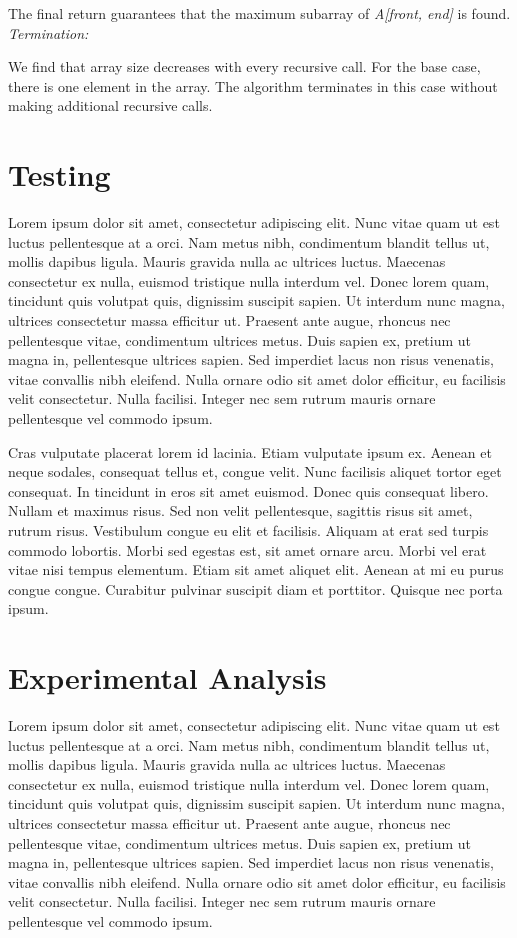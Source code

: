 \documentclass[11pt]{scrreprt}
\begin{document}
The final return guarantees that the maximum subarray of \textit{A[front, end]} is found. \\
\emph{Termination:}

We find that array size decreases with every recursive call. For the base case, there is one element in the array. The algorithm terminates in this case without making additional recursive calls.


\chapter{Testing}

Lorem ipsum dolor sit amet, consectetur adipiscing elit. Nunc vitae quam ut est luctus pellentesque at a orci. Nam metus nibh, condimentum blandit tellus ut, mollis dapibus ligula. Mauris gravida nulla ac ultrices luctus. Maecenas consectetur ex nulla, euismod tristique nulla interdum vel. Donec lorem quam, tincidunt quis volutpat quis, dignissim suscipit sapien. Ut interdum nunc magna, ultrices consectetur massa efficitur ut. Praesent ante augue, rhoncus nec pellentesque vitae, condimentum ultrices metus. Duis sapien ex, pretium ut magna in, pellentesque ultrices sapien. Sed imperdiet lacus non risus venenatis, vitae convallis nibh eleifend. Nulla ornare odio sit amet dolor efficitur, eu facilisis velit consectetur. Nulla facilisi. Integer nec sem rutrum mauris ornare pellentesque vel commodo ipsum.

Cras vulputate placerat lorem id lacinia. Etiam vulputate ipsum ex. Aenean et neque sodales, consequat tellus et, congue velit. Nunc facilisis aliquet tortor eget consequat. In tincidunt in eros sit amet euismod. Donec quis consequat libero. Nullam et maximus risus. Sed non velit pellentesque, sagittis risus sit amet, rutrum risus. Vestibulum congue eu elit et facilisis. Aliquam at erat sed turpis commodo lobortis. Morbi sed egestas est, sit amet ornare arcu. Morbi vel erat vitae nisi tempus elementum. Etiam sit amet aliquet elit. Aenean at mi eu purus congue congue. Curabitur pulvinar suscipit diam et porttitor. Quisque nec porta ipsum. 


\chapter{Experimental Analysis}

Lorem ipsum dolor sit amet, consectetur adipiscing elit. Nunc vitae quam ut est luctus pellentesque at a orci. Nam metus nibh, condimentum blandit tellus ut, mollis dapibus ligula. Mauris gravida nulla ac ultrices luctus. Maecenas consectetur ex nulla, euismod tristique nulla interdum vel. Donec lorem quam, tincidunt quis volutpat quis, dignissim suscipit sapien. Ut interdum nunc magna, ultrices consectetur massa efficitur ut. Praesent ante augue, rhoncus nec pellentesque vitae, condimentum ultrices metus. Duis sapien ex, pretium ut magna in, pellentesque ultrices sapien. Sed imperdiet lacus non risus venenatis, vitae convallis nibh eleifend. Nulla ornare odio sit amet dolor efficitur, eu facilisis velit consectetur. Nulla facilisi. Integer nec sem rutrum mauris ornare pellentesque vel commodo ipsum.
\end{document}
